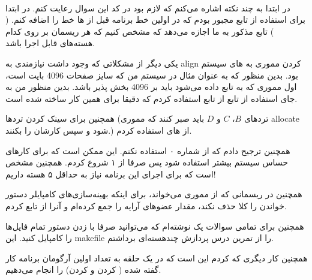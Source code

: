 \\\noindent
در ابتدا به چند نکته اشاره می‌کنم که لازم بود در کد این سوال رعایت کنم.
در ابتدا برای استفاده از تابع
\linebreak
{}
مجبور بودم که در اولین خط برنامه قبل از
ها
خط
\linebreak
{}
را اضافه کنم.
(
)
تابع مذکور به ما اجازه می‌دهد که مشخص کنیم که هر ریسمان بر روی کدام هسته‌های
قابل اجرا باشد.

یکی دیگر از مشکلاتی که وجود داشت نیازمندی به
align
کردن مموری به
های
سیستم بود. بدین منظور که به عنوان مثال در سیستم من که سایز صفحات 4096 بایت است،‌ اول مموری که
به تابع
داده می‌شود باید بر 4096 بخش پذیر باشد.
بدین منظور من به جای استفاده از تابع
از تابع
استفاده کردم که دقیقا برای همین کار ساخته شده است.

همچنین برای سینک کردن ترد‌ها
(ترد‌های $B$، $C$ و $D$ باید صبر کنند که مموری allocate شود و سپس کارشان را بکنند.)
از های 
استفاده کردم.

همچنین ترجیح دادم که از
شماره ۰ استفاده نکنم. این
ممکن است که برای کار‌های حساس سیستم بیشتر استفاده شود پس صرفا از ۱ شروع کردم.
همچنین مشخص است که برای اجرای این برنامه نیاز به حداقل ۵ هسته داریم!

همچنین در ریسمانی که از مموری می‌خواند، برای اینکه بهینه‌سازی‌های کامپایلر دستور خواندن را کلا
حذف نکند، مقدار عضو‌های آرایه را جمع کرده‌ام و آنرا از تابع
کردم.

همچنین برای تمامی سوالات یک
نوشته‌ام که می‌توانید صرفا با زدن دستور
تمام فایل‌ها را کامپایل کنید. این makefile
را از تمرین درس پردازش چند‌هسته‌ای برداشتم.

همچنین کار دیگری که کردم این است که در یک حلقه به تعداد اولین آرگومان برنامه کار گفته شده
( کردن و  کردن)
را انجام می‌دهیم.

